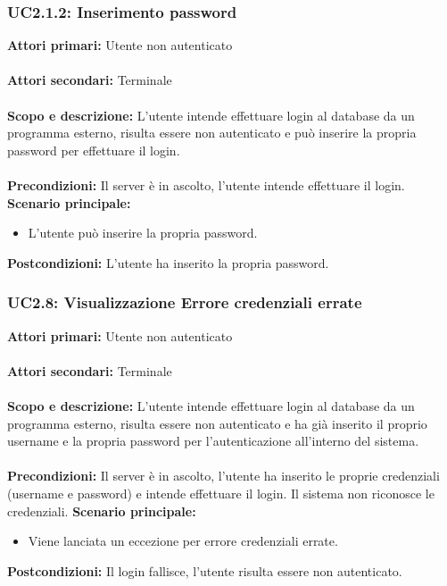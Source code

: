 \documentclass{scalatekids-article}
\begin{document}
\subsubsection{UC2.1.2: Inserimento password}

\textbf{Attori primari:} Utente non autenticato\\ \\
\textbf{Attori secondari:} Terminale\\ \\
\textbf{Scopo e descrizione:}
L'utente intende effettuare login al database da un programma  esterno, risulta essere non autenticato e può inserire la propria password per effettuare il login.\\ \\
\textbf{Precondizioni:} Il server è in ascolto, l'utente intende effettuare il login.
\textbf{Scenario principale:}
\begin{itemize}
\item L'utente può inserire la propria password.
\end{itemize}
\textbf{Postcondizioni:} L'utente ha inserito la propria password.

\subsubsection{UC2.8: Visualizzazione Errore credenziali errate}

\textbf{Attori primari:} Utente non autenticato\\ \\
\textbf{Attori secondari:} Terminale\\ \\
\textbf{Scopo e descrizione:}
L'utente intende effettuare login al database da un programma  esterno, risulta essere non autenticato e ha già inserito il proprio username e la propria password per l'autenticazione all'interno del sistema.\\ \\
\textbf{Precondizioni:} Il server è in ascolto, l'utente ha inserito le proprie credenziali (username e password) e intende effettuare il login. Il sistema non riconosce le credenziali.
\textbf{Scenario principale:}
\begin{itemize}
\item Viene lanciata un eccezione per errore credenziali errate.
\end{itemize}
\textbf{Postcondizioni:} Il login fallisce, l'utente risulta essere non autenticato.
\end{document}

